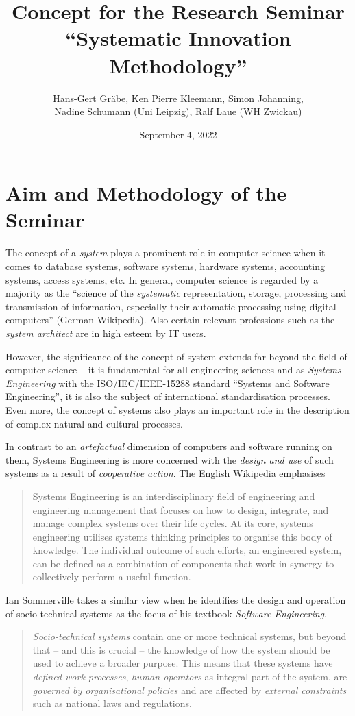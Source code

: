 \documentclass[11pt,a4paper]{article}
\title{Concept for the Research Seminar\\ \enquote{Systematic Innovation
    Methodology}}
\author{Hans-Gert Gr\"abe, Ken Pierre Kleemann, Simon Johanning,\\ Nadine
  Schumann (Uni Leipzig), Ralf Laue (WH Zwickau) }
\date{September 4, 2022}
\begin{document}
\maketitle

\section{Aim and Methodology of the Seminar}

The concept of a \emph{system} plays a prominent role in computer science when
it comes to database systems, software systems, hardware systems, accounting
systems, access systems, etc.  In general, computer science is regarded by a
majority as the \enquote{science of the \emph{systematic} representation,
  storage, processing and transmission of information, especially their
  automatic processing using digital computers} (German Wikipedia).  Also
certain relevant professions such as the \emph{system architect} are in high
esteem by IT users.

However, the significance of the concept of system extends far beyond the
field of computer science -- it is fundamental for all engineering sciences
and as \emph{Systems Engineering} with the ISO/IEC/IEEE-15288 standard
\enquote{Systems and Software Engineering}, it is also the subject of
international standardisation processes.  Even more, the concept of systems
also plays an important role in the description of complex natural and
cultural processes.

In contrast to an \emph{artefactual} dimension of computers and software
running on them, Systems Engineering is more concerned with the \emph{design
  and use} of such systems as a result of \emph{cooperative action}.  The
English Wikipedia emphasises 
\begin{quote}
  Systems Engineering is an interdisciplinary field of engineering and
  engineering management that focuses on how to design, integrate, and manage
  complex systems over their life cycles. At its core, systems engineering
  utilises systems thinking principles to organise this body of knowledge. The
  individual outcome of such efforts, an engineered system, can be defined as
  a combination of components that work in synergy to collectively perform a
  useful function.
\end{quote}

Ian Sommerville takes a similar view when he identifies the design and
operation of socio-technical systems as the focus of his textbook
\emph{Software Engineering}.
\begin{quote}  
  \emph{Socio-technical systems} contain one or more technical systems, but
  beyond that – and this is crucial – the knowledge of how the system should
  be used to achieve a broader purpose. This means that these systems have
  \emph{defined work processes}, \emph{human operators} as integral part of
  the system, are \emph{governed by organisational policies} and are affected
  by \emph{external constraints} such as national laws and regulations.
  \cite[p. 48]{Sommerville}
\end{quote}
\end{document}
